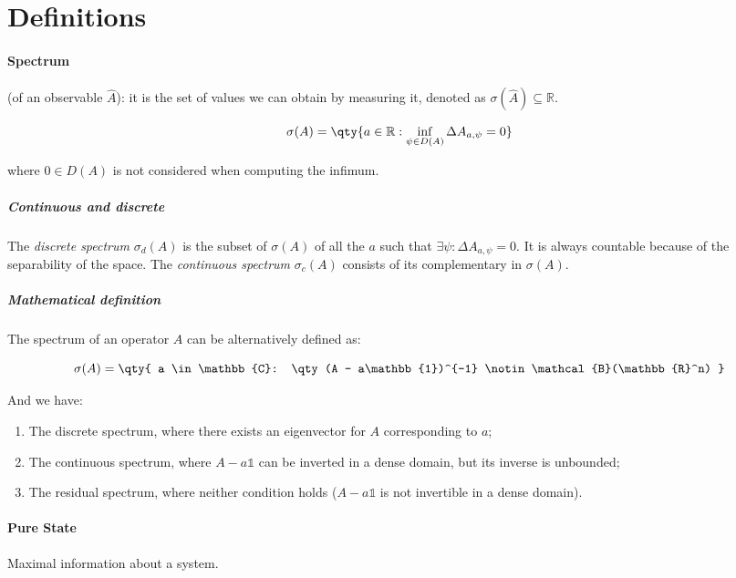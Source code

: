 \documentclass[../main.tex]{subfiles}
\begin{document}
\section{Definitions}

\paragraph{Spectrum} (of an observable $\hat{A}$): it is the set of values we can obtain by measuring it, denoted as $\sigma(\hat{A}) \subseteq \mathbb{R}$.

\begin{equation}
    \sigma(A) = \qty{
    a \in \mathbb{R}: \inf_{\psi \in D(A)} \Delta A_{a, \psi} = 0
    }
\end{equation}

where $0 \in D(A)$ is not considered when computing the infimum.

\subparagraph{Continuous and discrete} The \emph{discrete spectrum} $\sigma_d(A)$ is the subset of $\sigma (A)$ of all the $a$ such that $\exists \psi : \Delta A _{a, \psi} = 0$. It is always countable because of the separability of the space. The \emph{continuous spectrum} $\sigma_c(A)$ consists of its complementary in $\sigma(A)$.

\subparagraph{Mathematical definition} The spectrum of an operator $A$ can be alternatively defined as:

\begin{equation}
\sigma(A) = \qty{
a \in \mathbb{C}: \qty(A - a\mathbb{1})^{-1} \notin \mathcal{B}(\mathbb{R}^n)
}
\end{equation}

And we have:

\begin{enumerate}
    \item The discrete spectrum, where there exists an eigenvector for $A$ corresponding to $a$;
    \item The continuous spectrum, where $A-a\mathbb{1}$ can be inverted in a dense domain, but its inverse is unbounded;
    \item The residual spectrum, where neither condition holds ($A-a\mathbb{1}$ is not invertible in a dense domain).
\end{enumerate}

\paragraph{Pure State} Maximal information about a system.
\end{document}
